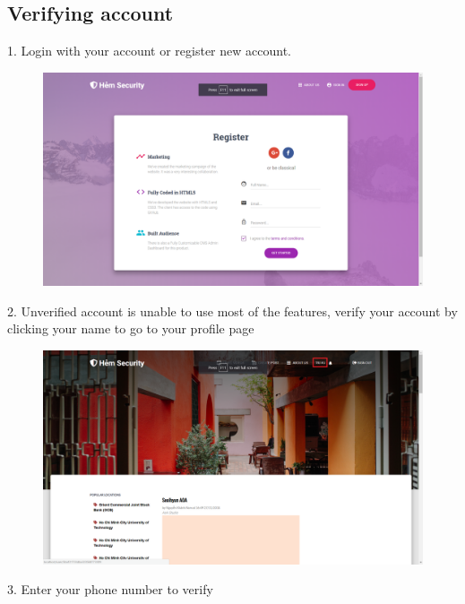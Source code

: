 \subsection{Verifying account}
1. Login with your account or register new account. 
\begin{center}
    \begin{figure}[H]
    \centering
    \includegraphics[width=1\columnwidth]{images/chap6/instruction1.png}
    \label{}
    \end{figure}
\end{center}
2. Unverified account is unable to use most of the features, verify your account by clicking your name to go to your profile page
\begin{center}
    \begin{figure}[H]
    \centering
    \includegraphics[width=1\columnwidth]{images/chap6/instruction2.png}
    \end{figure}
\end{center}
3. Enter your phone number to verify
